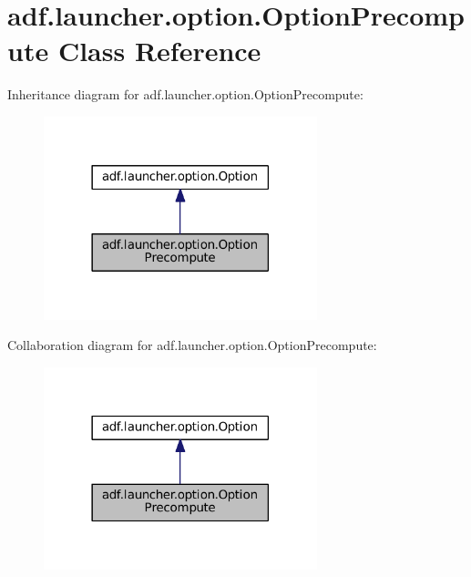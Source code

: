 \hypertarget{classadf_1_1launcher_1_1option_1_1OptionPrecompute}{}\section{adf.\+launcher.\+option.\+Option\+Precompute Class Reference}
\label{classadf_1_1launcher_1_1option_1_1OptionPrecompute}


Inheritance diagram for adf.\+launcher.\+option.\+Option\+Precompute\+:
\nopagebreak
\begin{figure}[H]
\begin{center}
\leavevmode
\includegraphics[width=225pt]{classadf_1_1launcher_1_1option_1_1OptionPrecompute__inherit__graph}
\end{center}
\end{figure}


Collaboration diagram for adf.\+launcher.\+option.\+Option\+Precompute\+:
\nopagebreak
\begin{figure}[H]
\begin{center}
\leavevmode
\includegraphics[width=225pt]{classadf_1_1launcher_1_1option_1_1OptionPrecompute__coll__graph}
\end{center}
\end{figure}
